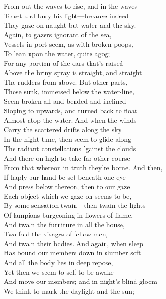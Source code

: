 From out the waves to rise, and in the waves\\
To set and bury his light—because indeed\\
They gaze on naught but water and the sky.\\
Again, to gazers ignorant of the sea,\\
Vessels in port seem, as with broken poops,\\
To lean upon the water, quite agog;\\
For any portion of the oars that's raised\\
Above the briny spray is straight, and straight\\
The rudders from above. But other parts,\\
Those sunk, immersed below the water-line,\\
Seem broken all and bended and inclined\\
Sloping to upwards, and turned back to float\\
Almost atop the water. And when the winds\\
Carry the scattered drifts along the sky\\
In the night-time, then seem to glide along\\
The radiant constellations 'gainst the clouds\\
And there on high to take far other course\\
From that whereon in truth they're borne. And then,\\
If haply our hand be set beneath one eye\\
And press below thereon, then to our gaze\\
Each object which we gaze on seems to be,\\
By some sensation twain—then twain the lights\\
Of lampions burgeoning in flowers of flame,\\
And twain the furniture in all the house,\\
Two-fold the visages of fellow-men,\\
And twain their bodies. And again, when sleep\\
Has bound our members down in slumber soft\\
And all the body lies in deep repose,\\
Yet then we seem to self to be awake\\
And move our members; and in night's blind gloom\\
We think to mark the daylight and the sun;\\
